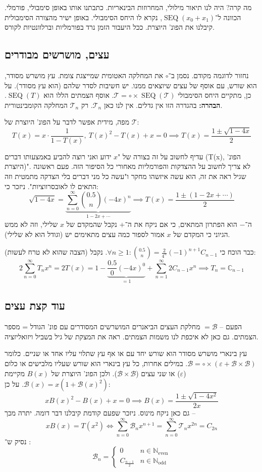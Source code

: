 \documentclass[]{article}
\newcommand\N     {\mathbb{N}}
\newcommand\C     {\mathbb{C}}
\newcommand\bc    {\mathcal{B}}
\newcommand\tc    {\mathcal{T}}
\newcommand\epsi  {\varepsilon}
\newcommand\Neven {\N_{\mathrm{even}}}
\newcommand\Nodd  {\N_{\mathrm{odd }}}
\DeclareMathOperator\seq   {SEQ}
\renewcommand\inf {\infty}
\newcommand\co        {\colon}
\begin{document}
	 מה קרה? היה לנו תיאור מילולי, המחרוזות הבינאריות. כתבתנו אותו באופן סימבולי, פורמלי. הכוונה ל־$\seq(x_0 + x_1)$, נקרא לו היחס הסימבולי. באופן ישיר מהצורה הסימבולית קיבלנו את הפונ' היוצרת. ככל היעבור הזמן נרד בפורמליות וברלוונטיות לקורס. 
	 
	 \subsection{עצים, מושרשים מבודרים}
	 נחזור לדוגמה מקודם. נסמן ב־$\circ$ את המחלקה האטומית שמייצגת צומת. עץ מושרש מסודר, הוא שורש, עם אוסף של עצים שיוצאים ממנו. יש חשיבות לסדר שלהם (הוא עץ מסודר). על כן, מתקיים היחס הסימבולי $\tc = \circ \times \seq(\tc)$. אוסף הצמתים הללו הוא $\seq(T)$. \textbf{הבהרה: }בהגדרה הזו אין גדלים. אין לנו כאן $\tc_{n}$. רק $\tc_n$ המחלקה הקומבינטורית. 
	 
	 מפה, מידית אפשר לדבר על הפונ' היוצרת של $\tc$: 
	 \[ T(x) = x \cdot \frac{1}{1 - T(x)}, \ T(x)^2 - T(x) + x = 0 \implies T(x) = \frac{1\pm\sqrt{1 - 4x}}{2}\]
	 
	 עדיף לחשוב על זה בצורה של "$x$ ידוע ואני רוצה להביע באמצעותו דברים (T(x), הפונ' היוצרת)". לא צריך לחשוב על ההצדקות והפורמליות מאחורי כל הסיפור הזה. פעם ראשונה שגיל ראה את זה, הוא עשה איזשהו מחקר ו"עשה כל מני דברים בלי הצדקה מתמטית וזה התאים לו לאובסרווציות". ניזכר כי: 
	 \[ \sqrt{1 - 4x}=\underbrace{\sum_{n = 0}^{\inf}\binom{0.5}{n}(-4x)^{n}}_{1 - 2x + \cdots} \implies T(x) = \frac{1\pm(1 - 2x + \cdots )}{2} \]
	 ה־$-$ הוא הפתרון המתאים, כי אם ניקח את ה־$+$ נקבל שהמקדם של $x$ שלילי, וזה לא ממש הגיוני כי המקדם של $x$ אמור לספור כמה עצים מתאימים יש (וגודל הוא לא שלילי). 
	 
	 כבר הוכח כי $\forall n \ge 1 \co \binom{0.5}{n} = \frac{2}{4^n}(-1)^{n + 1}C_{n -1}$. נקבל (הצבה שהוא לא טרח לעשות): 
	 \[ 2\sum_{n = 0}^{\inf}T_nx^n = 2T(x) = 1 - \underbrace{\frac{0.5}{0}(-4x)^{0}}_{=1} + \sum_{n = 1}^{\inf}2C_{n -1}x^{n}  \implies T_n = \C_{n - 1} \]
	 
	 
	 \subsection{עוד קצת עצים}
	 הפעם – $=\bc$ מחלקת העצים הביאנרים המושרשים המסודרים עם פונ' הגודל = מספר הצמתים. גם כאן לא איכפת לנו משמות הצמתים. ראה את המצקת של גיל בשביל ויזואליזציה. 
	 
	 עץ בינארי מושרש מסודר הוא שורש יחד עם או אף עץ שתלוי עליו אחד או שניים. כלומר $\bc = \circ \times (\epsi + \bc \times \bc)$. במילים אחרות, כל עץ בינארי הוא שורש שעליו מלבישים או כלום ($\epsi$) או שני עצים ($\bc \times \bc$). ולכן הפונ' היוצרת של $B(x)$ מקיימת $\bc(x) = x(1 + \bc(x)^2)$. על כן: 
	 \[ xB(x)^2 - B(x)  +x = 0 \implies B(x) = \frac{1 \pm \sqrt{1 - 4x^2}}{2x} \]
	 גם כאן ניקח מינוס. ניזכר שפעם קודמת קיבלנו דבר דומה. יתרה מכך – 
	 \[ xB(x) = T(x^2) \iff \sum_{n = 0}^{\inf} \bc_nx^{n + 1} = \sum_{n = 0}^{\inf}\tc_n x^{2n} = C_{2n} \]
	 נסיק ש־ :
	 \[ \bc_n = \begin{cases}
	 	0 & n \in \Neven \\
	 	C_{\frac{n - 1}{2}} & n \in \Nodd
	 \end{cases} \]
	 
\end{document}
